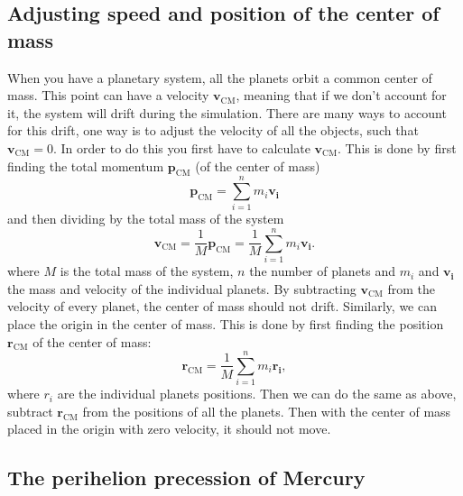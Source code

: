 \documentclass[reprint, english,notitlepage,nofootinbib]{revtex4-1}  %
\newcommand{\vc}[1]{\mathbf{#1}}
\begin{document}
\subsection{Adjusting speed and position of the center of mass}

When you have a planetary system, all the planets orbit a common center of mass. This point can have a velocity $\vc v_{\text{CM}}$, meaning that if we don't account for it, the system will drift during the simulation. There are many ways to account for this drift, one way is to adjust the velocity of all the objects, such that $\vc v_{\text{CM}} = 0$. In order to do this you first have to calculate $\vc v_{\text{CM}}$. This is done by first finding the total momentum $\mathbf{p}_{\text{CM}}$ (of the center of mass)
\begin{equation*}
	\mathbf{p}_{\text{CM}} = \sum_{i=1}^{n}m_i\mathbf{v_i}
\end{equation*}
and then dividing by the total mass of the system
\begin{equation}
	\label{eq:v_cm}
	\mathbf{v}_{\text{CM}} = \frac{1}{M}\mathbf{p}_{\text{CM}} =  \frac{1}{M}\sum_{i=1}^{n}m_i\mathbf{v_i}.
\end{equation}
where $M$ is the total mass of the system, $n$ the number of planets and $m_i$ and $\mathbf{v_i}$ the mass and velocity of the individual planets. By subtracting $\mathbf{v}_{\text{CM}}$ from the velocity of every planet, the center of mass should not drift. Similarly, we can place the origin in the center of mass. This is done by first finding the position $\mathbf{r}_{\text{CM}}$ of the center of mass:
\begin{equation}
	\label{eq:r_cm}
	\mathbf{r}_{\text{CM}} =  \frac{1}{M}\sum_{i=1}^{n}m_i\mathbf{r_i},
\end{equation}
where $r_i$ are the individual planets positions. Then we can do the same as above, subtract $\mathbf{r}_{\text{CM}}$ from the positions of all the planets. Then with the center of mass placed in the origin with zero velocity, it should not move.


\subsection{The perihelion precession of Mercury}
\end{document}

